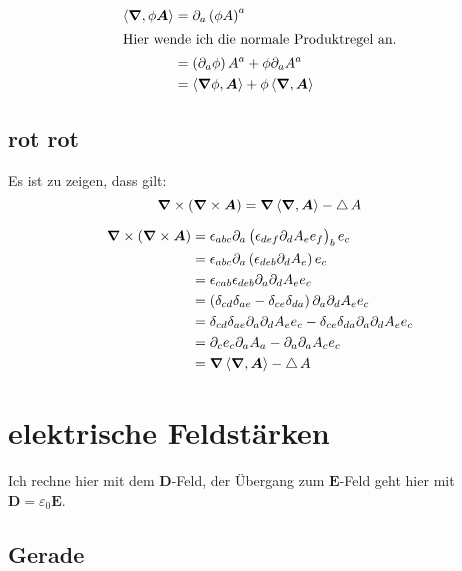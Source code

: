 \documentclass[11pt, ngerman]{article}
\newcommand{\divergence}[1]{\inner{\vnabla}{#1}}
\newcommand{\inner}[2]{\left\langle #1, #2 \right\rangle}
\newcommand{\laplace}{\mathop{{}\bigtriangleup}\nolimits}
\newcommand{\vnabla}{\vec \nabla}
\renewcommand{\vec}[1]{\boldsymbol{#1}}
\begin{document}
\begin{align*}
	\divergence{\phi \vec A}
	&= \partial_a \del{\phi A}^a \\
	\intertext{Hier wende ich die normale Produktregel an.}
	&= \del{\partial_a \phi} A^a + \phi \partial_a A^a \\
	&= \inner{\vnabla \phi}{\vec A} + \phi \divergence{\vec A}
\end{align*}

\subsection{rot rot}

Es ist zu zeigen, dass gilt:
\[ \vnabla \times \del{\vnabla \times \vec A} = \vnabla \divergence{\vec A} - \laplace A \]

\begin{align*}
	\vnabla \times \del{\vnabla \times \vec A}
	&= \epsilon_{abc} \partial_a \del{\epsilon_{def} \partial_d A_e e_f}_b e_c \\
	&= \epsilon_{abc} \partial_a \del{\epsilon_{deb} \partial_d A_e} e_c \\
	&= \epsilon_{cab} \epsilon_{deb} \partial_a \partial_d A_e e_c \\
	&= \del{\delta_{cd} \delta_{ae} - \delta_{ce} \delta_{da}} \partial_a \partial_d A_e e_c \\
	&= \delta_{cd} \delta_{ae} \partial_a \partial_d A_e e_c - \delta_{ce} \delta_{da} \partial_a \partial_d A_e e_c \\
	&= \partial_c e_c \partial_a A_a - \partial_a \partial_a A_c e_c \\
	&= \vnabla \divergence{\vec A} - \laplace A
\end{align*}


\section{elektrische Feldstärken}

Ich rechne hier mit dem $\vec D$-Feld, der Übergang zum $\vec E$-Feld geht hier
mit $\vec D = \varepsilon_0 \vec E$.

\subsection{Gerade}
\end{document}

